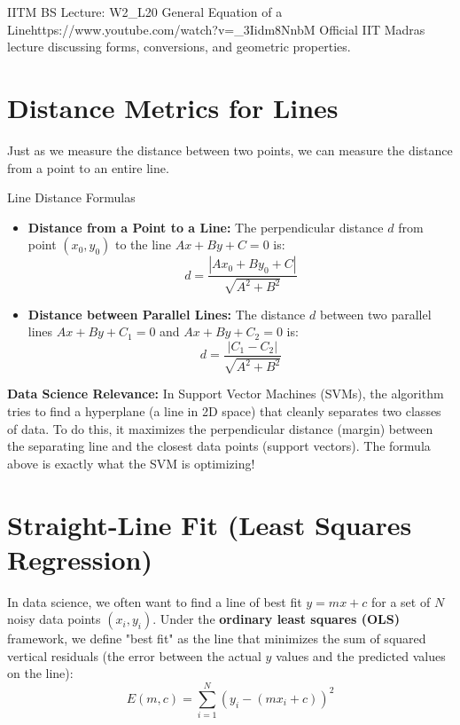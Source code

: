 \begin{videocard}{IITM BS Lecture: W2\_L20 General Equation of a Line}{https://www.youtube.com/watch?v=_3Iidm8NnbM}
Official IIT Madras lecture discussing forms, conversions, and geometric properties.
\end{videocard}

\section{Distance Metrics for Lines}

Just as we measure the distance between two points, we can measure the distance from a point to an entire line.

\begin{formulabox}{Line Distance Formulas}
\begin{itemize}
    \item \textbf{Distance from a Point to a Line:} The perpendicular distance $d$ from point $(x_0, y_0)$ to the line $Ax + By + C = 0$ is:
    $$d = \frac{|Ax_0 + By_0 + C|}{\sqrt{A^2 + B^2}}$$
    \item \textbf{Distance between Parallel Lines:} The distance $d$ between two parallel lines $Ax + By + C_1 = 0$ and $Ax + By + C_2 = 0$ is:
    $$d = \frac{|C_1 - C_2|}{\sqrt{A^2 + B^2}}$$
\end{itemize}
\end{formulabox}

\textbf{Data Science Relevance:} In Support Vector Machines (SVMs), the algorithm tries to find a hyperplane (a line in 2D space) that cleanly separates two classes of data. To do this, it maximizes the perpendicular distance (margin) between the separating line and the closest data points (support vectors). The formula above is exactly what the SVM is optimizing!

\section{Straight-Line Fit (Least Squares Regression)}

In data science, we often want to find a line of best fit $y = mx + c$ for a set of $N$ noisy data points $(x_i, y_i)$. Under the \textbf{ordinary least squares (OLS)} framework, we define "best fit" as the line that minimizes the sum of squared vertical residuals (the error between the actual $y$ values and the predicted values on the line):
$$E(m, c) = \sum_{i=1}^N (y_i - (m x_i + c))^2$$

